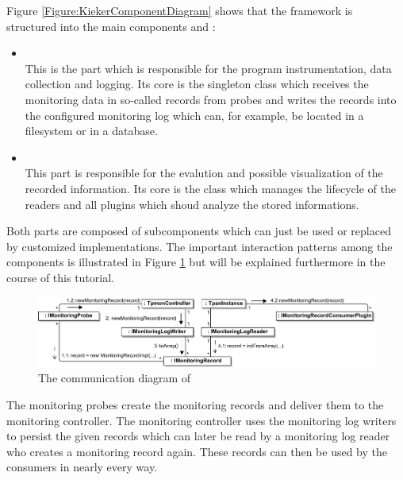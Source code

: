 \noindent Figure \ref{Figure:KiekerComponentDiagram} shows that the framework is structured %
into the main components \KiekerMonitoringPart{} and \KiekerAnalysisPart{}:
\begin{itemize}
\item \KiekerMonitoringPart\\
This is the part which is responsible for the program instrumentation, data %
collection and logging.  Its core is the singleton class  %
\notify which receives the monitoring data in so-called records from probes and %
writes the records into the configured monitoring log which can, for example, %
be located in a filesystem or in a database.
\item \KiekerAnalysisPart\\
This part is responsible for the evalution and possible visualization of the %
recorded information. Its core is the class  \notify %
which manages the lifecycle of the readers and all plugins which shoud analyze %
the stored informations.
\end{itemize}

\noindent Both parts are composed of subcomponents which can just be used or %
replaced by customized implementations. The important interaction patterns among %
the components is illustrated in Figure \ref{Figure:KiekerCommunicationDiagram} %
but will be explained furthermore in the course of this tutorial. %

\begin{figure}[H]\centering
\includegraphics[width=1\textwidth]{images/kiekerCommunications-revisedReArranged-woMonitoringLog-bw}
\caption{The communication diagram of \Kieker}
\label{Figure:KiekerCommunicationDiagram}
\end{figure}
		
\noindent\notify The monitoring probes create the monitoring records and deliver them to the monitoring controller. The monitoring controller uses the monitoring log writers to persist the given records which can later be read by a monitoring log reader who creates a monitoring record again. These records can then be used by the consumers in nearly every way.

